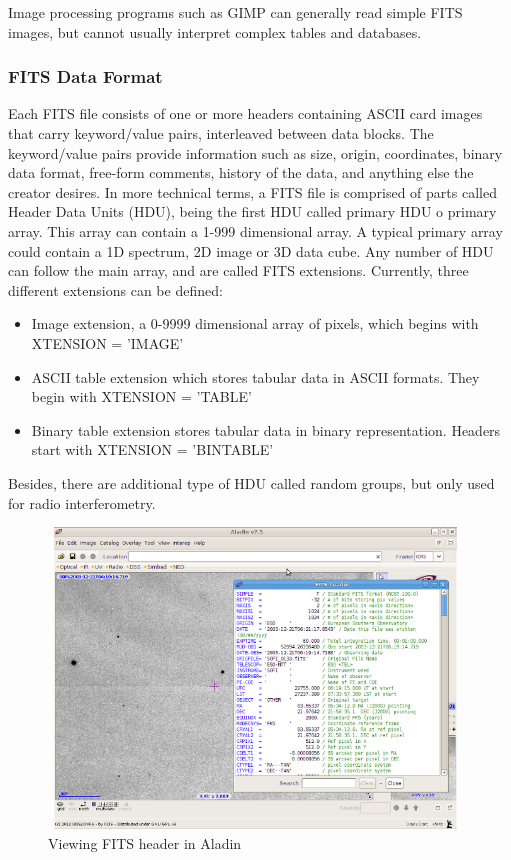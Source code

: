 Image processing programs such as GIMP can generally read simple FITS images, but cannot usually interpret complex tables and databases.

\subsubsection{FITS Data Format}

Each FITS file consists of one or more headers containing ASCII card images that carry keyword/value pairs, interleaved between data blocks. The keyword/value pairs provide information such as size, origin, coordinates, binary data format, free-form comments, history of the data, and anything else the creator desires. In more technical terms, a FITS file is comprised of parts called Header Data Units (HDU), being the first HDU called primary HDU o primary array. This array can contain a 1-999 dimensional array. A typical primary array could contain a 1D spectrum, 2D image or 3D data cube. Any number of HDU can follow the main array, and are called FITS extensions. Currently, three different extensions can be defined:

\begin{itemize}
\item Image extension, a 0-9999 dimensional array of pixels, which begins with XTENSION = 'IMAGE'
\item ASCII table extension which stores tabular data in ASCII formats. They begin with XTENSION = 'TABLE'
\item Binary table extension stores tabular data in binary representation. Headers start with XTENSION = 'BINTABLE'
\end{itemize}

Besides, there are additional type of HDU called random groups, but only used for radio interferometry.
      
\begin{figure}[H]
\centering
\includegraphics[width=11cm,height=8cm]{images/fits_header.png}
\caption{Viewing FITS header in Aladin}
\end{figure}


